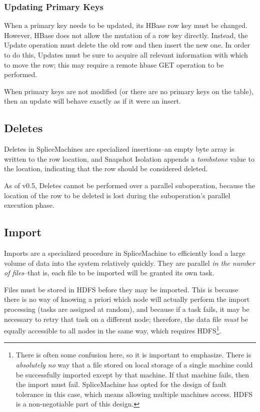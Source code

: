 \subsubsection{Updating Primary Keys}
When a primary key needs to be updated, its HBase row key must be changed. However, HBase does not allow the mutation of a row key directly. Instead, the Update operation must delete the old row and then insert the new one. In order to do this, Updates must be sure to acquire all relevant information with which to move the row; this may require a remote hbase GET operation to be performed.

When primary keys are not modified (or there are no primary keys on the table), then an update will behave exactly as if it were an insert.

\subsection{Deletes}
Deletes in SpliceMachines are specialized insertions--an empty byte array is written to the row location, and Snapshot Isolation appends a \emph{tombstone} value to the location, indicating that the row should be considered deleted.

As of v0.5, Deletes cannot be performed over a parallel suboperation, because the location of the row to be deleted is lost during the suboperation's parallel execution phase.

\subsection{Import}
Imports are a specialized procedure in SpliceMachine to efficiently load a large volume of data into the system relatively quickly. They are parallel \emph{in the number of files}--that is, each file to be imported will be granted its own task. 

Files must be stored in HDFS before they may be imported. This is because there is no way of knowing a priori which node will actually perform the import processing (tasks are assigned at random), and because if a task fails, it may be necessary to retry that task on a different node; therefore, the data file \emph{must} be equally accessible to all nodes in the same way, which requires HDFS\footnote{There is often some confusion here, so it is important to emphasize. There is \emph{absolutely no} way that a file stored on local storage of a single machine could be successfully imported except by that machine. If that machine fails, then the import must fail. SpliceMachine has opted for the design of fault tolerance in this case, which means allowing multiple machines access. HDFS is a non-negotiable part of this design. }.

